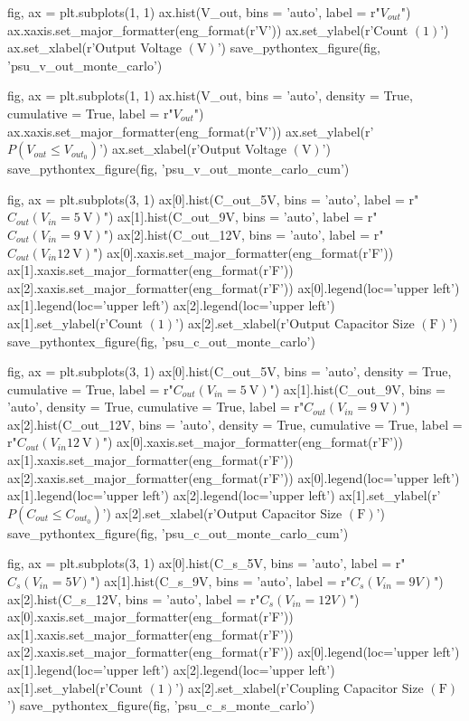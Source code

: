 \documentclass[12pt, titlepage]{tex-template}
\begin{document}
\begin{pycode}
fig, ax = plt.subplots(1, 1)
ax.hist(V_out, bins = 'auto', label = r"$V_{out}$")
ax.xaxis.set_major_formatter(eng_format(r'\unit{\volt}'))
ax.set_ylabel(r'Count $\left(1\right)$')
ax.set_xlabel(r'Output Voltage $\left(\unit{\volt}\right)$')
save_pythontex_figure(fig, 'psu_v_out_monte_carlo')

fig, ax = plt.subplots(1, 1)
ax.hist(V_out, bins = 'auto', density = True, cumulative = True, label = r"$V_{out}$")
ax.xaxis.set_major_formatter(eng_format(r'\unit{\volt}'))
ax.set_ylabel(r'$P\left(V_{out} \leq V_{out_0}\right)$')
ax.set_xlabel(r'Output Voltage $\left(\unit{\volt}\right)$')
save_pythontex_figure(fig, 'psu_v_out_monte_carlo_cum')

fig, ax = plt.subplots(3, 1)
ax[0].hist(C_out_5V, bins = 'auto', label = r"$C_{out}(V_{in}=\SI{5}{\volt})$")
ax[1].hist(C_out_9V, bins = 'auto', label = r"$C_{out}(V_{in}=\SI{9}{\volt})$")
ax[2].hist(C_out_12V, bins = 'auto', label = r"$C_{out}(V_{in}\SI{12}{\volt})$")
ax[0].xaxis.set_major_formatter(eng_format(r'\unit{\farad}'))
ax[1].xaxis.set_major_formatter(eng_format(r'\unit{\farad}'))
ax[2].xaxis.set_major_formatter(eng_format(r'\unit{\farad}'))
ax[0].legend(loc='upper left')
ax[1].legend(loc='upper left')
ax[2].legend(loc='upper left')
ax[1].set_ylabel(r'Count $\left(1\right)$')
ax[2].set_xlabel(r'Output Capacitor Size $\left(\unit{\farad}\right)$')
save_pythontex_figure(fig, 'psu_c_out_monte_carlo')

fig, ax = plt.subplots(3, 1)
ax[0].hist(C_out_5V, bins = 'auto', density = True, cumulative = True, label = r"$C_{out}(V_{in}=\SI{5}{\volt})$")
ax[1].hist(C_out_9V, bins = 'auto', density = True, cumulative = True, label = r"$C_{out}(V_{in}=\SI{9}{\volt})$")
ax[2].hist(C_out_12V, bins = 'auto', density = True, cumulative = True, label = r"$C_{out}(V_{in}\SI{12}{\volt})$")
ax[0].xaxis.set_major_formatter(eng_format(r'\unit{\farad}'))
ax[1].xaxis.set_major_formatter(eng_format(r'\unit{\farad}'))
ax[2].xaxis.set_major_formatter(eng_format(r'\unit{\farad}'))
ax[0].legend(loc='upper left')
ax[1].legend(loc='upper left')
ax[2].legend(loc='upper left')
ax[1].set_ylabel(r'$P\left(C_{out} \leq C_{out_0}\right)$')
ax[2].set_xlabel(r'Output Capacitor Size $\left(\unit{\farad}\right)$')
save_pythontex_figure(fig, 'psu_c_out_monte_carlo_cum')

fig, ax = plt.subplots(3, 1)
ax[0].hist(C_s_5V, bins = 'auto', label = r"$C_{s}(V_{in}=5V)$")
ax[1].hist(C_s_9V, bins = 'auto', label = r"$C_{s}(V_{in}=9V)$")
ax[2].hist(C_s_12V, bins = 'auto', label = r"$C_{s}(V_{in}=12V)$")
ax[0].xaxis.set_major_formatter(eng_format(r'\unit{\farad}'))
ax[1].xaxis.set_major_formatter(eng_format(r'\unit{\farad}'))
ax[2].xaxis.set_major_formatter(eng_format(r'\unit{\farad}'))
ax[0].legend(loc='upper left')
ax[1].legend(loc='upper left')
ax[2].legend(loc='upper left')
ax[1].set_ylabel(r'Count $\left(1\right)$')
ax[2].set_xlabel(r'Coupling Capacitor Size $\left(\unit{\farad}\right)$')
save_pythontex_figure(fig, 'psu_c_s_monte_carlo')


\end{pycode}
\end{document}
